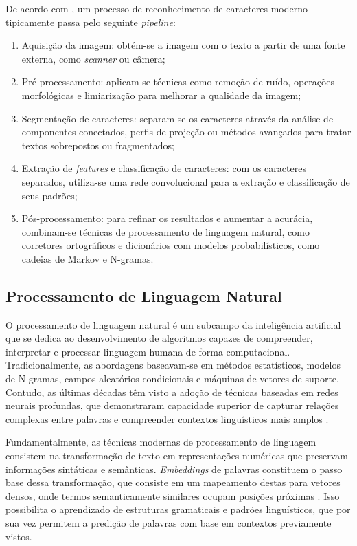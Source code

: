 De acordo com \citeauthor*{ocr} \cite*{ocr}, um processo de reconhecimento de caracteres moderno tipicamente passa pelo seguinte \textit{pipeline}:

\begin{enumerate}
	\item Aquisição da imagem: obtém-se a imagem com o texto a partir de uma fonte externa, como \textit{scanner} ou câmera;
	\item Pré-processamento: aplicam-se técnicas como remoção de ruído, operações morfológicas e limiarização para melhorar a qualidade da imagem;
	\item Segmentação de caracteres: separam-se os caracteres através da análise de componentes conectados, perfis de projeção ou métodos avançados para tratar textos sobrepostos ou fragmentados;
	\item Extração de \textit{features} e classificação de caracteres: com os caracteres separados, utiliza-se uma rede convolucional para a extração e classificação de seus padrões;
	\item Pós-processamento: para refinar os resultados e aumentar a acurácia, combinam-se técnicas de processamento de linguagem natural, como corretores ortográficos e dicionários com modelos probabilísticos, como cadeias de Markov e N-gramas.
\end{enumerate}

\subsection{Processamento de Linguagem Natural}

O processamento de linguagem natural é um subcampo da inteligência artificial que se dedica ao desenvolvimento de algoritmos capazes de compreender, interpretar e processar linguagem humana de forma computacional. Tradicionalmente, as abordagens baseavam-se em métodos estatísticos, modelos de N-gramas, campos aleatórios condicionais e máquinas de vetores de suporte. Contudo, as últimas décadas têm visto a adoção de técnicas baseadas em redes neurais profundas, que demonstraram capacidade superior de capturar relações complexas entre palavras e compreender contextos linguísticos mais amplos \cite{nlp}.

Fundamentalmente, as técnicas modernas de processamento de linguagem consistem na transformação de texto em representações numéricas que preservam informações sintáticas e semânticas. \textit{Embeddings} de palavras constituem o passo base dessa transformação, que consiste em um mapeamento destas para vetores densos, onde termos semanticamente similares ocupam posições próximas \cite{nlp}. Isso possibilita o aprendizado de estruturas gramaticais e padrões linguísticos, que por sua vez permitem a predição de palavras com base em contextos previamente vistos.


